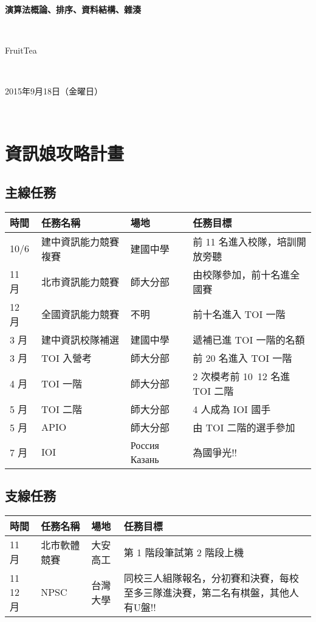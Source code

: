 \documentclass{article}
\title{\hmwkClass}
\author{\hmwkAuthorName}
\date{\hmwkDueDate}
\def\normalsize{\fontsize{12}{16}\selectfont}
\def\large{\fontsize{16}{24}\selectfont}
\def\LARGE{\fontsize{24}{36}\selectfont}
\newcommand{\hmwkDueDate}{2015年9月18日（金曜日）} %
\newcommand{\hmwkClass}{演算法概論、排序、資料結構、雜湊} %
\newcommand{\hmwkAuthorName}{FruitTea} %
\begin{document}
\LARGE~\\[4ex]
\centerline{\bf\hmwkClass}\large\\[2ex]\centerline{\hmwkAuthorName}\\[2ex]\centerline{\hmwkDueDate}\\
\normalsize


\section{資訊娘攻略計畫}

\subsection{主線任務}
\begin{tabular}[t]{lllp{7cm}}
\hline
時間 & 任務名稱 & 場地 & 任務目標 \\
\hline
10/6 & 建中資訊能力競賽複賽 & 建國中學 & 前 11 名進入校隊，培訓開放旁聽\\
11 月 & 北市資訊能力競賽 & 師大分部 & 由校隊參加，前十名進全國賽\\
12 月 & 全國資訊能力競賽 & 不明 & 前十名進入 TOI 一階\\
3 月 & 建中資訊校隊補選 & 建國中學 & 遞補已進 TOI 一階的名額\\
3 月 & TOI 入營考 & 師大分部 & 前 20 名進入 TOI 一階\\
4 月 & TOI 一階 & 師大分部 & 2 次模考前 10~12 名進 TOI 二階\\
5 月 & TOI 二階 & 師大分部 & 4 人成為 IOI 國手\\
5 月 & APIO & 師大分部 & 由 TOI 二階的選手參加\\
7 月 & IOI & Россия Казань & 為國爭光!!\\
\hline
\end{tabular}

\subsection{支線任務}
\begin{tabular}[t]{lllp{9cm}}
\hline
時間 & 任務名稱 & 場地 & 任務目標 \\
\hline
11 月 & 北市軟體競賽 & 大安高工 & 第 1 階段筆試第 2 階段上機\\
11 12 月 & NPSC & 台灣大學 & 同校三人組隊報名，分初賽和決賽，每校至多三隊進決賽，第二名有棋盤，其他人有U盤!!\\
\hline
\end{tabular}
\end{document}
